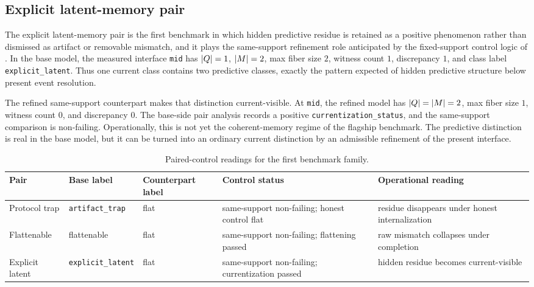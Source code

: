 \documentclass[11pt]{article}
\theoremstyle{definition}
\begin{document}
\subsection{Explicit latent-memory pair}\label{subsec:bench-explicit-latent}
The explicit latent-memory pair is the first benchmark in which hidden predictive residue is retained as a positive phenomenon rather than dismissed as artifact or removable mismatch, and it plays the same-support refinement role anticipated by the fixed-support control logic of \citep{Tsiokos2026EventPackages}. In the base model, the measured interface \texttt{mid} has $|Q|=1$, $|M|=2$, max fiber size $2$, witness count $1$, discrepancy $1$, and class label \texttt{explicit\_latent}. Thus one current class contains two predictive classes, exactly the pattern expected of hidden predictive structure below present event resolution.

The refined same-support counterpart makes that distinction current-visible. At \texttt{mid}, the refined model has $|Q|=|M|=2$, max fiber size $1$, witness count $0$, and discrepancy $0$. The base-side pair analysis records a positive \texttt{currentization\_status}, and the same-support comparison is non-failing. Operationally, this is not yet the coherent-memory regime of the flagship benchmark. The predictive distinction is real in the base model, but it can be turned into an ordinary current distinction by an admissible refinement of the present interface.

\begin{table}[H]
\centering
\caption{Paired-control readings for the first benchmark family.}
\label{tab:bench-control-pairs}
\footnotesize
\setlength{\tabcolsep}{4pt}
\begin{tabularx}{\linewidth}{@{}>{\raggedright\arraybackslash}p{.13\linewidth}>{\raggedright\arraybackslash}p{.14\linewidth}>{\raggedright\arraybackslash}p{.12\linewidth}>{\raggedright\arraybackslash}p{.23\linewidth}>{\raggedright\arraybackslash}X@{}}
\toprule
Pair & Base label & Counterpart label & Control status & Operational reading \\
\midrule
Protocol trap & \nolinkurl{artifact_trap} & flat & same-support non-failing; honest control flat & residue disappears under honest internalization \\
Flattenable & flattenable & flat & same-support non-failing; flattening passed & raw mismatch collapses under completion \\
Explicit latent & \nolinkurl{explicit_latent} & flat & same-support non-failing; currentization passed & hidden residue becomes current-visible \\
\bottomrule
\end{tabularx}
\end{table}
\end{document}
